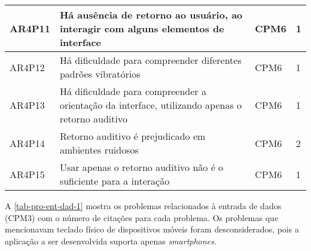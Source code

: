 \begin{table}[htb]
\begin{center}
\begin{tabular}{p{1.2cm}|p{10.0cm}|p{1.4cm}|p{1.4cm}}
      \hline
      AR4P11          & Há ausência de retorno ao usuário, ao interagir com alguns elementos de interface               & CPM6               & 1                 \\
      \hline
      AR4P12          & Há dificuldade para compreender diferentes padrões vibratórios                                  & CPM6               & 1                 \\
      \hline
      AR4P13          & Há dificuldade para compreender a orientação da interface, utilizando apenas o retorno auditivo & CPM6               & 1                 \\
      \hline
      AR4P14          & Retorno auditivo é prejudicado em ambientes ruidosos                                            & CPM6               & 2                 \\
      \hline
      AR4P15          & Usar apenas o retorno auditivo não é o suficiente para a interação                              & CPM6               & 1                 \\
    \end{tabular}
  \end{center}
\end{table}

\newpage

A \autoref{tab-pro-ent-dad-1} mostra os problemas relacionados à entrada de dados (CPM3) com o número de citações para cada problema.
Os problemas que mencionavam teclado físico de dispositivos móveis foram desconsiderados, pois a aplicação a ser desenvolvida suporta apenas \emph{smartphones}.


